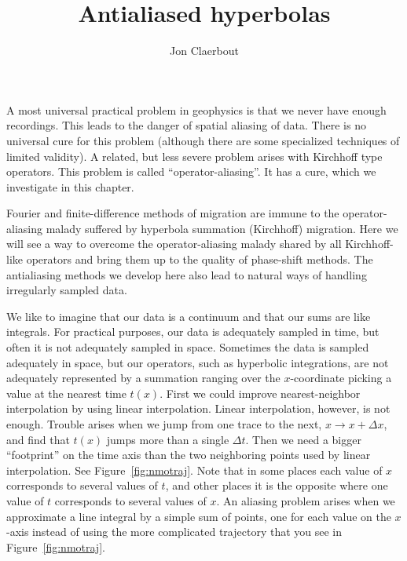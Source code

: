 
\def\AACAKE{all}	%

\title{Antialiased hyperbolas}
\author{Jon Claerbout}
\maketitle
\label{paper:trimo}

\par
A most universal practical problem in geophysics
is that we never have enough recordings.
This leads to the danger of spatial aliasing of data.
There is no universal cure for this problem
(although there are some specialized techniques of limited validity).
A related, but less severe problem
arises with Kirchhoff type operators.
This problem is called ``operator-aliasing''.
It has a cure, which we investigate in this chapter.

\par
Fourier and finite-difference methods of migration
are immune to the operator-aliasing malady suffered
by hyperbola summation (Kirchhoff) migration.
Here we will see a way to overcome the operator-aliasing malady
shared by all Kirchhoff-like operators
and bring them up to the quality of phase-shift methods.
The antialiasing methods we develop here also lead
to natural ways of handling irregularly sampled data.

\par
{}
We like to imagine that our data is a continuum
and that our sums are like integrals.
For practical purposes, our data is adequately sampled in time,
but often it is not adequately sampled in space.
Sometimes the data is sampled adequately in space,
but our operators, such as hyperbolic integrations,
are not adequately represented by a summation
ranging over the $x$-coordinate
picking a value at the nearest time $t(x)$.
First we could improve nearest-neighbor interpolation
by using linear interpolation.
Linear interpolation, however, is not enough.
Trouble arises
when we jump from one trace to the next,
$x \rightarrow x+\Delta x$,
and find that $t(x)$ jumps more than a single $\Delta t$.
Then we need a bigger ``footprint'' on the time axis
than the two neighboring points used by linear interpolation.
See Figure~\ref{fig:nmotraj}.
Note that in some places each value of $x$ corresponds
to several values of $t$,
and other places it is the opposite where one value of $t$
corresponds to several values of $x$.
An aliasing problem arises
when we approximate a line integral
by a simple sum of points,
one for each value on the $x$-axis
instead of using the more complicated
trajectory that you see in Figure~\ref{fig:nmotraj}.
%


